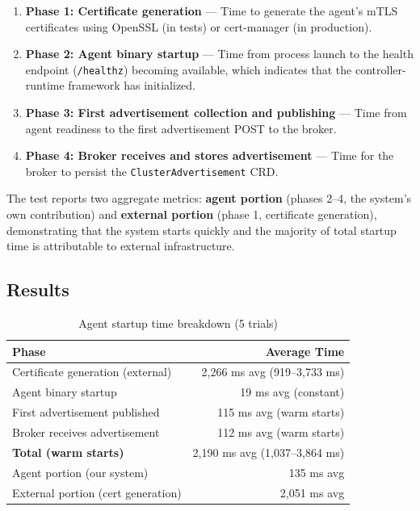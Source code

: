 \begin{enumerate}
    \item \textbf{Phase 1: Certificate generation} --- Time to generate the agent's mTLS certificates using OpenSSL (in tests) or cert-manager (in production).
    \item \textbf{Phase 2: Agent binary startup} --- Time from process launch to the health endpoint (\texttt{/healthz}) becoming available, which indicates that the controller-runtime framework has initialized.
    \item \textbf{Phase 3: First advertisement collection and publishing} --- Time from agent readiness to the first advertisement POST to the broker.
    \item \textbf{Phase 4: Broker receives and stores advertisement} --- Time for the broker to persist the \texttt{ClusterAdvertisement} CRD.
\end{enumerate}

The test reports two aggregate metrics: \textbf{agent portion} (phases 2--4, the system's own contribution) and \textbf{external portion} (phase 1, certificate generation), demonstrating that the system starts quickly and the majority of total startup time is attributable to external infrastructure.

\subsection{Results}

\begin{table}[htbp]
\centering
\caption{Agent startup time breakdown (5 trials)}
\label{tab:test7}
\begin{tabular}{@{}lr@{}}
\toprule
\textbf{Phase} & \textbf{Average Time} \\
\midrule
Certificate generation (external)  & 2,266 ms avg (919--3,733 ms) \\
Agent binary startup               & 19 ms avg (constant) \\
First advertisement published      & 115 ms avg (warm starts) \\
Broker receives advertisement      & 112 ms avg (warm starts) \\
\midrule
\textbf{Total (warm starts)}       & 2,190 ms avg (1,037--3,864 ms) \\
Agent portion (our system)         & 135 ms avg \\
External portion (cert generation) & 2,051 ms avg \\
\bottomrule
\end{tabular}
\end{table}

